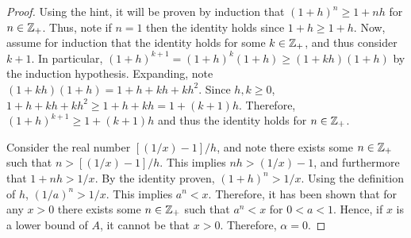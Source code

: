 \documentclass[12pt]{article}
\begin{document}
\begin{enumerate}[label=(\alph*)]
\begin{proof}
			Using the hint, it will be proven by induction that $(1 + h)^n \geq 1 + nh$ for $n \in \mathbb{Z}_{+}$.
			Thus, note if $n = 1$ then the identity holds since $1 + h \geq 1 + h$. Now, assume for 
			induction that the identity holds for some $k \in \mathbb{Z}_{+}$, and thus consider $k + 1$.
			In particular, $(1 + h)^{k + 1} = (1 + h)^k (1 + h) \geq (1 + kh)(1+ h)$ by the induction 
			hypothesis. Expanding, note $(1 + kh)(1+ h) = 1 + h + kh + kh^2$. Since $h, k \geq 0$,
			$1 + h + kh + kh^2 \geq 1 + h + kh = 1 + (k + 1)h$. Therefore, $(1 + h)^{k+1} \geq 1 + (k+1)h$
			and thus the identity holds for $n \in \mathbb{Z}_{+}$. 
			
			Consider the real number $[(1/x) - 1]/h$, and note there exists some $n \in \mathbb{Z}_{+}$ such
			that $n > [(1/x) - 1]/h$. This implies $nh > (1/x) - 1$, and furthermore that 
			$1 + nh > 1/x$. By the identity proven, $(1 + h)^n > 1/x$. Using the definition of 
			$h$, $(1/a)^n > 1/x$. This implies $a^n < x$. Therefore, it has been shown that for any
			$x > 0$ there exists some $n \in \mathbb{Z}_{+}$ such that $a^n < x$ for $0 < a < 1$. Hence,
			if $x$ is a lower bound of $A$, it cannot be that $x > 0$. Therefore, $\alpha = 0$.
		\end{proof}
	\end{enumerate}
	
\end{document}
